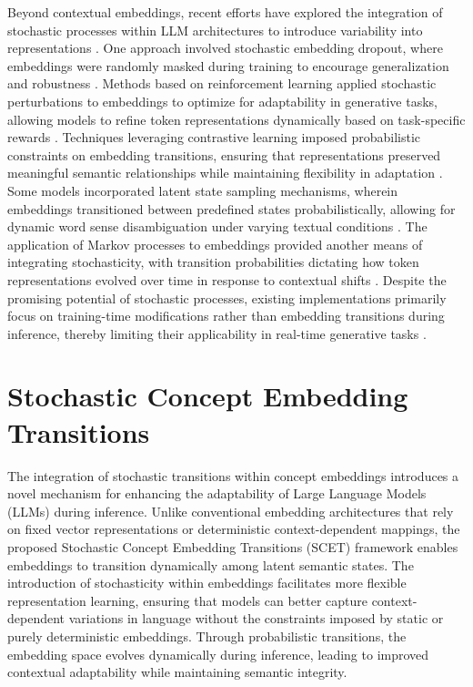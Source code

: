 \documentclass{article}
\begin{document}
Beyond contextual embeddings, recent efforts have explored the integration of stochastic processes within LLM architectures to introduce variability into representations \cite{novado2024multi}. One approach involved stochastic embedding dropout, where embeddings were randomly masked during training to encourage generalization and robustness \cite{meibuki2024improving}. Methods based on reinforcement learning applied stochastic perturbations to embeddings to optimize for adaptability in generative tasks, allowing models to refine token representations dynamically based on task-specific rewards \cite{ sawhai2024token}. Techniques leveraging contrastive learning imposed probabilistic constraints on embedding transitions, ensuring that representations preserved meaningful semantic relationships while maintaining flexibility in adaptation \cite{grayson2024mitigating}. Some models incorporated latent state sampling mechanisms, wherein embeddings transitioned between predefined states probabilistically, allowing for dynamic word sense disambiguation under varying textual conditions \cite{ping2024measuring}. The application of Markov processes to embeddings provided another means of integrating stochasticity, with transition probabilities dictating how token representations evolved over time in response to contextual shifts \cite{li2024evaluating, shao2024automated}. Despite the promising potential of stochastic processes, existing implementations primarily focus on training-time modifications rather than embedding transitions during inference, thereby limiting their applicability in real-time generative tasks \cite{roberts2024extending}.



\section{Stochastic Concept Embedding Transitions}

The integration of stochastic transitions within concept embeddings introduces a novel mechanism for enhancing the adaptability of Large Language Models (LLMs) during inference. Unlike conventional embedding architectures that rely on fixed vector representations or deterministic context-dependent mappings, the proposed Stochastic Concept Embedding Transitions (SCET) framework enables embeddings to transition dynamically among latent semantic states. The introduction of stochasticity within embeddings facilitates more flexible representation learning, ensuring that models can better capture context-dependent variations in language without the constraints imposed by static or purely deterministic embeddings. Through probabilistic transitions, the embedding space evolves dynamically during inference, leading to improved contextual adaptability while maintaining semantic integrity.
\end{document}
